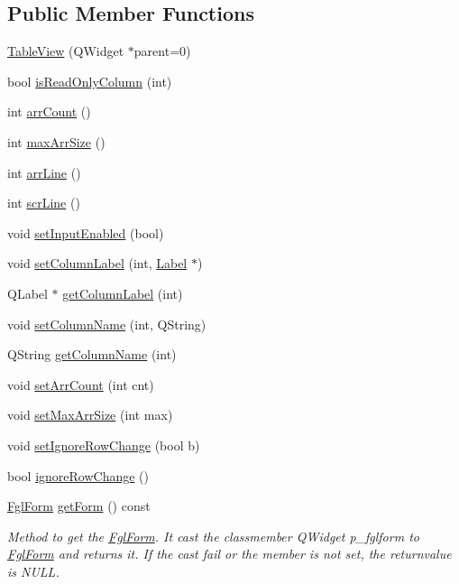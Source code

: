 \subsection*{Public Member Functions}
\begin{DoxyCompactItemize}
\item 
\hyperlink{classTableView_adb6530c7759567b474c3a3b7ba81855c}{TableView} (QWidget $\ast$parent=0)
\item 
bool \hyperlink{classTableView_a845c45c80748f79f3e81f7bf77e5261a}{isReadOnlyColumn} (int)
\item 
int \hyperlink{classTableView_a35187a10df2c76c9fe9099d17d9869cd}{arrCount} ()
\item 
int \hyperlink{classTableView_a2573035b04bb9582878096d501381e3b}{maxArrSize} ()
\item 
int \hyperlink{classTableView_a7ec1fcd1ab0302dde810332c72602273}{arrLine} ()
\item 
int \hyperlink{classTableView_aecb8d3ea59d572fb9a7df9a7ba798c20}{scrLine} ()
\item 
void \hyperlink{classTableView_ac80392b3e39df8bb876d5ac378375caf}{setInputEnabled} (bool)
\item 
void \hyperlink{classTableView_a5a86ed0c209382e0c31266952d3fafaf}{setColumnLabel} (int, \hyperlink{classLabel}{Label} $\ast$)
\item 
QLabel $\ast$ \hyperlink{classTableView_a22d025267d25ecfe7684c31edab75a2a}{getColumnLabel} (int)
\item 
void \hyperlink{classTableView_ac8f1f15e7ec4e97a15560d1c00ce7b02}{setColumnName} (int, QString)
\item 
QString \hyperlink{classTableView_af953c1328e203f9b0d380b9d5c6125ff}{getColumnName} (int)
\item 
void \hyperlink{classTableView_a2bd7391fdc86cdd2f57f40b220aacf9d}{setArrCount} (int cnt)
\item 
void \hyperlink{classTableView_a53b722124712ba16befce5b620a82a8f}{setMaxArrSize} (int max)
\item 
void \hyperlink{classTableView_a41a45f3b1b6fc2be38f7068629bd9462}{setIgnoreRowChange} (bool b)
\item 
bool \hyperlink{classTableView_a83872a716abf63ed862c2c4607dc4146}{ignoreRowChange} ()
\item 
\hyperlink{classFglForm}{FglForm} \hyperlink{classTableView_a9dc54c4342e2d05f754129376dcd032f}{getForm} () const 
\begin{DoxyCompactList}\small\item\em Method to get the \hyperlink{classFglForm}{FglForm}. It cast the classmember QWidget p\_\-fglform to \hyperlink{classFglForm}{FglForm} and returns it. If the cast fail or the member is not set, the returnvalue is NULL. \item\end{DoxyCompactList}\item 

\end{DoxyCompactItemize}

